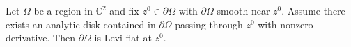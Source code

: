 
Let $\Omega$ be a region in $\mathbb{C}^2$ and fix $z^0 \in \partial \Omega$ with $\partial \Omega$ smooth near $z^0$. Assume there exists an analytic disk contained in $\partial \Omega$ passing through $z^0$ with nonzero derivative. Then $\partial \Omega$ is Levi-flat at $z^0$.
